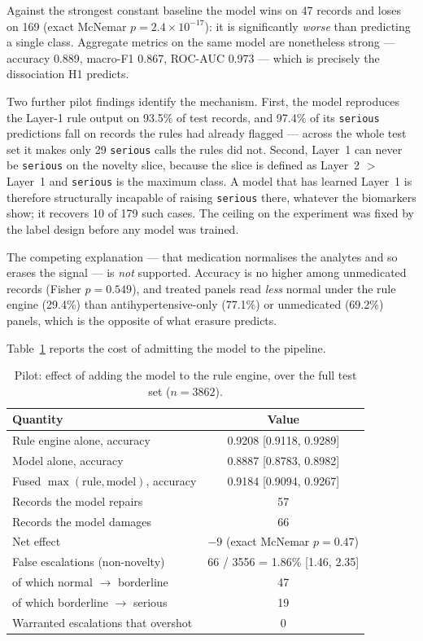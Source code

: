 \documentclass[11pt,a4paper]{article}
\begin{document}
Against the strongest constant baseline the model wins on 47 records and loses on
169 (exact McNemar $p = 2.4\times10^{-17}$): it is significantly \emph{worse} than
predicting a single class. Aggregate metrics on the same model are nonetheless
strong --- accuracy 0.889, macro-F1 0.867, ROC-AUC 0.973 --- which is precisely
the dissociation H1 predicts.

Two further pilot findings identify the mechanism. First, the model reproduces the
Layer-1 rule output on 93.5\% of test records, and 97.4\% of its \texttt{serious}
predictions fall on records the rules had already flagged --- across the whole test
set it makes only 29 \texttt{serious} calls the rules did not. Second, Layer~1 can
never be \texttt{serious} on the novelty slice, because the slice is defined as
Layer~2 $>$ Layer~1 and \texttt{serious} is the maximum class. A model that has
learned Layer~1 is therefore structurally incapable of raising \texttt{serious}
there, whatever the biomarkers show; it recovers 10 of 179 such cases. The ceiling
on the experiment was fixed by the label design before any model was trained.

The competing explanation --- that medication normalises the analytes and so erases
the signal --- is \emph{not} supported. Accuracy is no higher among unmedicated
records (Fisher $p = 0.549$), and treated panels read \emph{less} normal under the
rule engine (29.4\%) than antihypertensive-only (77.1\%) or unmedicated (69.2\%)
panels, which is the opposite of what erasure predicts.

Table~\ref{tab:fusion} reports the cost of admitting the model to the pipeline.

\begin{table}[h!]
\centering
\caption{Pilot: effect of adding the model to the rule engine, over the full test
set ($n = 3862$).\label{tab:fusion}}
\renewcommand{\arraystretch}{1.15}
\begin{tabular}{|l|c|}
\hline
\textbf{Quantity} & \textbf{Value} \\
\hline
Rule engine alone, accuracy      & 0.9208 [0.9118, 0.9289] \\
Model alone, accuracy            & 0.8887 [0.8783, 0.8982] \\
Fused $\max(\text{rule},\text{model})$, accuracy & 0.9184 [0.9094, 0.9267] \\
\hline
Records the model repairs        & 57 \\
Records the model damages        & 66 \\
Net effect                       & $-9$ (exact McNemar $p = 0.47$) \\
\hline
False escalations (non-novelty)  & 66 / 3556 = 1.86\% [1.46, 2.35] \\
\quad of which normal $\to$ borderline & 47 \\
\quad of which borderline $\to$ serious & 19 \\
Warranted escalations that overshot & 0 \\
\hline
\end{tabular}
\end{table}
\end{document}
